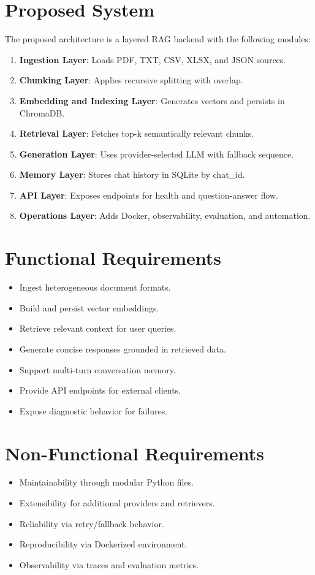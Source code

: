 \documentclass[12pt,letterpaper]{report}
\begin{document}
\section{Proposed System}
The proposed architecture is a layered RAG backend with the following modules:
\begin{enumerate}
\item \textbf{Ingestion Layer}: Loads PDF, TXT, CSV, XLSX, and JSON sources.
\item \textbf{Chunking Layer}: Applies recursive splitting with overlap.
\item \textbf{Embedding and Indexing Layer}: Generates vectors and persists in ChromaDB.
\item \textbf{Retrieval Layer}: Fetches top-k semantically relevant chunks.
\item \textbf{Generation Layer}: Uses provider-selected LLM with fallback sequence.
\item \textbf{Memory Layer}: Stores chat history in SQLite by chat\_id.
\item \textbf{API Layer}: Exposes endpoints for health and question-answer flow.
\item \textbf{Operations Layer}: Adds Docker, observability, evaluation, and automation.
\end{enumerate}

\section{Functional Requirements}
\begin{itemize}
\item Ingest heterogeneous document formats.
\item Build and persist vector embeddings.
\item Retrieve relevant context for user queries.
\item Generate concise responses grounded in retrieved data.
\item Support multi-turn conversation memory.
\item Provide API endpoints for external clients.
\item Expose diagnostic behavior for failures.
\end{itemize}

\section{Non-Functional Requirements}
\begin{itemize}
\item Maintainability through modular Python files.
\item Extensibility for additional providers and retrievers.
\item Reliability via retry/fallback behavior.
\item Reproducibility via Dockerized environment.
\item Observability via traces and evaluation metrics.
\end{itemize}
\end{document}
